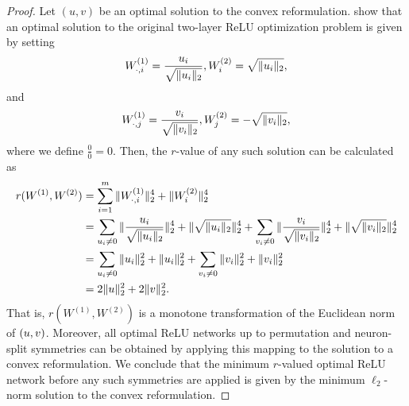 \minNormNN*
\begin{proof}
    Let \( (u, v) \) be an optimal solution to the convex reformulation.
    \citet{pilanci2020convexnn} show that an optimal solution to the original
    two-layer ReLU optimization problem is given by setting
    \[
        W^{(1)}_{\cdot, i} = \frac{u_i}{\sqrt{\|u_i\|_2}}, W^{(2)}_{i} = \sqrt{\|u_i\|_2},
    \]
    and
    \[
        W^{(1)}_{\cdot, j} = \frac{v_i}{\sqrt{\|v_i\|_2}}, W^{(2)}_{j} = -\sqrt{\|v_i\|_2},
    \]
    where we define \( \frac{0}{0} = 0 \).
    Then, the \( r \)-value of any such solution can be calculated as
    \begin{align*}
        r(W^{(1)}, W^{(2)})
         & = \sum_{i = 1}^m \|W^{(1)}_{\cdot, i}\|_2^4 + \|W^{(2)}_{i}\|_2^4                                 \\
         & = \sum_{u_i \neq 0} \|\frac{u_i}{\sqrt{\|u_i\|_2}}\|_2^4 + \|\sqrt{\|u_i\|_2}\|_2^4
        + \sum_{v_i \neq 0} \|\frac{v_i}{\sqrt{\|v_i\|_2}}\|_2^4 + \|\sqrt{\|v_i\|_2}\|_2^4            \\
         & = \sum_{u_i \neq 0} \|u_i\|_2^2 + \|u_i\|_2^2 + \sum_{v_i \neq 0} \|v_i\|_2^2 + \|v_i\|^2_2 \\
         & = 2 \|u\|_2^2 + 2 \|v\|_2^2.
    \end{align*}
    That is, \( r(W^{(1)}, W^{(2)}) \) is a monotone transformation of the Euclidean
    norm of \( \left(u, v\right) \).
    Moreover, all optimal ReLU networks up to permutation and neuron-split
    symmetries can be obtained by applying this mapping to the solution to a convex reformulation.
    We conclude that the minimum \( r \)-valued optimal ReLU network before any
    such symmetries  are applied is given by the minimum \( \ell_2 \)-norm
    solution to the convex reformulation.


\end{proof}
